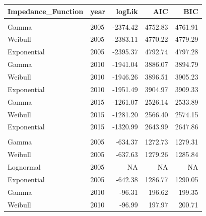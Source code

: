 \documentclass[
11pt, %
oneside, %
english, %
singlespacing, %
]{macthesis} %
\begin{document}
\begin{table}
\centering\begingroup\fontsize{9}{11}\selectfont

\begin{tabular}{llrrr}
\toprule
Impedance\_Function & year & logLik & AIC & BIC\\
\midrule
\addlinespace[0.3em]
\multicolumn{5}{l}{\textbf{Destination: Grocery store}}\\
\hspace{1em}Gamma & 2005 & -2374.42 & 4752.83 & 4761.91\\
\hspace{1em}Weibull & 2005 & -2383.11 & 4770.22 & 4779.29\\
\hspace{1em}Exponential & 2005 & -2395.37 & 4792.74 & 4797.28\\
\hspace{1em}Gamma & 2010 & -1941.04 & 3886.07 & 3894.79\\
\hspace{1em}Weibull & 2010 & -1946.26 & 3896.51 & 3905.23\\
\hspace{1em}Exponential & 2010 & -1951.49 & 3904.97 & 3909.33\\
\hspace{1em}Gamma & 2015 & -1261.07 & 2526.14 & 2533.89\\
\hspace{1em}Weibull & 2015 & -1281.20 & 2566.40 & 2574.15\\
\hspace{1em}Exponential & 2015 & -1320.99 & 2643.99 & 2647.86\\
\addlinespace[0.3em]
\multicolumn{5}{l}{\textbf{Destination: Restaurant}}\\
\hspace{1em}Gamma & 2005 & -634.37 & 1272.73 & 1279.31\\
\hspace{1em}Weibull & 2005 & -637.63 & 1279.26 & 1285.84\\
\hspace{1em}Lognormal & 2005 & NA & NA & \vphantom{1} NA\\
\hspace{1em}Exponential & 2005 & -642.38 & 1286.77 & 1290.05\\
\hspace{1em}Gamma & 2010 & -96.31 & 196.62 & 199.35\\
\hspace{1em}Weibull & 2010 & -96.99 & 197.97 & 200.71\\

\end{tabular}
\end{table}
\end{document}

